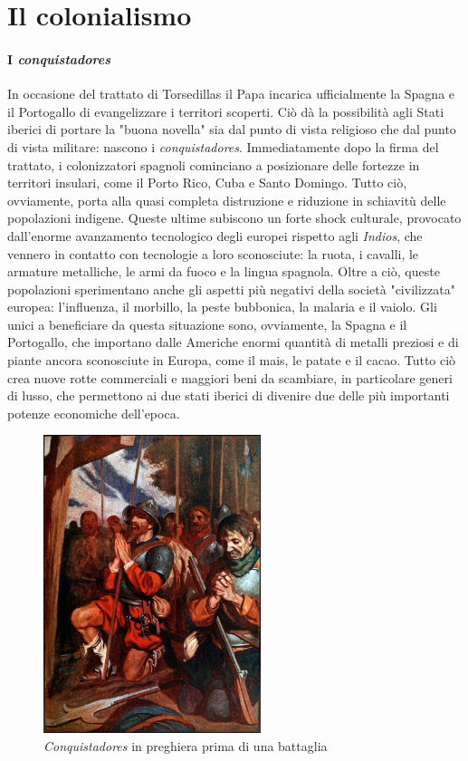 \documentclass[11pt]{report}
\begin{document}
	\section*{Il colonialismo}
	
	\paragraph*{I \textit{conquistadores}}
	
	In occasione del trattato di Torsedillas il Papa incarica ufficialmente la Spagna e il Portogallo di evangelizzare i territori scoperti. Ciò dà la possibilità agli Stati iberici di portare la "buona novella" sia dal punto di vista religioso che dal punto di vista militare: nascono i \textit{conquistadores}. Immediatamente dopo la firma del trattato, i colonizzatori spagnoli cominciano a posizionare delle fortezze in territori insulari, come il Porto Rico, Cuba e Santo Domingo. Tutto ciò, ovviamente, porta alla quasi completa distruzione e riduzione in schiavitù delle popolazioni indigene. Queste ultime subiscono un forte  shock culturale, provocato dall'enorme avanzamento tecnologico degli europei rispetto agli \textit{Indios}, che vennero in contatto con tecnologie a loro sconosciute: la ruota, i cavalli, le armature metalliche, le armi da fuoco e la lingua spagnola. Oltre a ciò, queste popolazioni sperimentano anche gli aspetti più negativi della società "civilizzata" europea: l'influenza, il morbillo, la peste bubbonica, la malaria e il vaiolo.\cite{crosby1967conquistador} Gli unici a beneficiare da questa situazione sono, ovviamente, la Spagna e il Portogallo, che importano dalle Americhe enormi quantità di metalli preziosi e di piante ancora sconosciute in Europa, come il mais, le patate e il cacao. Tutto ciò crea nuove rotte commerciali e maggiori beni da scambiare, in particolare generi di lusso, che permettono ai due stati iberici di divenire due delle più importanti potenze economiche dell'epoca. 
	
	\begin{figure}
		\includegraphics[width=2.5in]{"conquistadores"}
		\caption{{\small  \textit{Conquistadores} in preghiera prima di una battaglia}}
	\end{figure}
	
\end{document}
